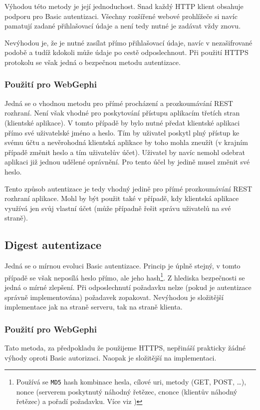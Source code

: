 \documentclass[thesis=M,czech]{FITthesis}[2014/05/6]
\begin{document}
Výhodou této metody je její jednoduchost. Snad každý HTTP klient obsahuje podporu pro Basic autentizaci. Všechny rozšířené webové prohlížeče si navíc pamatují 
zadané přihlašovací údaje a není tedy nutné je zadávat vždy znovu.

Nevýhodou je, že je nutné zasílat přímo přihlašovací údaje, navíc v nezašifrované podobě a tudíž kdokoli může údaje po cestě odposlechnout. Při použití HTTPS protokolu se však
jedná o bezpečnou metodu autentizace.

\subsubsection{Použití pro WebGephi}
Jedná se o vhodnou metodu pro přímé procházení a prozkoumávání REST rozhraní. Není však vhodné pro poskytování přístupu aplikacím třetích stran (klientské aplikace).
V tomto případě by bylo nutné předat klientské aplikaci přímo své uživatelské jméno a heslo. Tím by uživatel poskytl plný přístup ke svému účtu a nevěrohodná klientská
aplikace by toho mohla zneužít (v krajním případě změnit heslo a tím  uživatelův účet). Uživatel by navíc nemohl odebrat aplikaci již jednou udělené oprávnění. 
Pro tento účel by jedině musel změnit své heslo.

Tento způsob autentizace je tedy vhodný jedině pro přímé prozkoumávání REST rozhraní aplikace. Mohl by být použit také v případě,
kdy klientská aplikace využívá jen svůj vlastní účet (může případně řešit správu uživatelů na své straně). 

\subsection{Digest autentizace\cite{wiki:digest}}
Jedná se o mírnou evoluci Basic autentizace. Princip je úplně stejný, v tomto případě se však neposílá heslo přímo, ale jeho hash\footnote{Používá se \texttt{MD5} hash kombinace hesla, cílové uri, metody (GET, POST, \ldots), nonce (serverem 
poskytnutý náhodný řetězec, cnonce (klientův náhodný řetězec) a pořadí požadavku. Více viz \cite{wiki:digest})}.
Z hlediska bezpečnosti se jedná o mírné zlepšení. Při odposlechnutí požadavku nelze (pokud je autentizace správně implementována) požadavek zopakovat.
Nevýhodou je složitější implementace jak na straně serveru, tak na straně klienta.

\subsubsection{Použití pro WebGephi}
Tato metoda, za předpokladu že použijeme HTTPS, nepřináší prakticky žádné výhody oproti Basic autorizaci. Naopak je složitější na implementaci.
\end{document}
